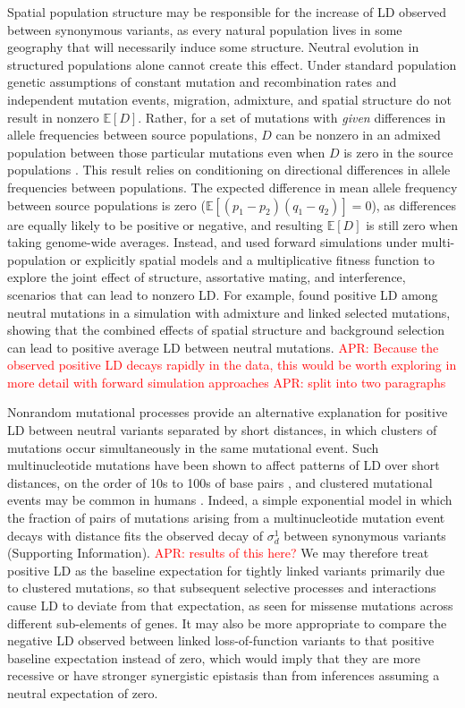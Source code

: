 \documentclass[]{article}
\newcommand{\E}{\mathbb{E}}
\newcommand{\comment}[1]{{\textcolor{red}{APR: #1}}}
\begin{document}
Spatial population structure may be responsible for the increase of LD observed
between synonymous variants, as every natural population lives in some
geography that will necessarily induce some structure. Neutral evolution in
structured populations alone cannot create this effect. Under standard
population genetic assumptions of constant mutation and recombination rates and
independent mutation events, migration, admixture, and spatial structure do not
result in nonzero \(\E[D]\). Rather, for a set of mutations with \emph{given}
differences in allele frequencies between source populations, \(D\) can be
nonzero in an admixed population between those particular mutations even when
\(D\) is zero in the source populations \citep{Cavalli-Sforza1971-jv}. This
result relies on conditioning on directional differences in allele frequencies
between populations. The expected difference in mean allele frequency between
source populations is zero (\(\E[(p_1-p_2)(q_1-q_2)] = 0\)), as differences are
equally likely to be positive or negative, and resulting \(\E[D]\) is still
zero when taking genome-wide averages. Instead, \citet{Sohail2017-zq} and
\citet{Sandler2021-of} used forward simulations under multi-population or
explicitly spatial models and a multiplicative fitness function to explore the
joint effect of structure, assortative mating, and interference, scenarios that
can lead to nonzero LD. For example, \citet{Sandler2021-of} found positive LD
among neutral mutations in a simulation with admixture and linked selected
mutations, showing that the combined effects of spatial structure and background
selection can lead to positive average LD between neutral mutations.
\comment{Because the observed positive LD decays rapidly in the data, this
would be worth exploring in more detail with forward simulation approaches}
\comment{split into two paragraphs}

Nonrandom mutational processes provide an alternative explanation for positive
LD between neutral variants separated by short distances, in which clusters of
mutations occur simultaneously in the same mutational event. Such
multinucleotide mutations have been shown to affect patterns of LD over short
distances, on the order of 10s to 100s of base pairs \citep{Harris2014-zg}, and
clustered mutational events may be common in humans \citep{Besenbacher2016-ac}.
Indeed, a simple exponential model in which the fraction of pairs of mutations
arising from a multinucleotide mutation event decays with distance fits the
observed decay of \(\sigma_d^1\) between synonymous variants (Supporting
Information). \comment{results of this here?}
We may therefore treat positive
LD as the baseline expectation for tightly linked variants primarily due to
clustered mutations, so that subsequent selective processes and interactions
cause LD to deviate from that expectation, as seen for missense mutations
across different sub-elements of genes. It may also be more appropriate to
compare the negative LD observed between linked loss-of-function variants to
that positive baseline expectation instead of zero, which would imply that they
are more recessive or have stronger synergistic epistasis than from inferences
assuming a neutral expectation of zero.
\end{document}
